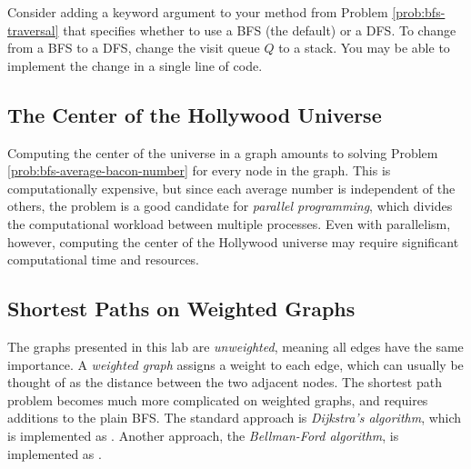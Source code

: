Consider adding a keyword argument to your method from Problem \ref{prob:bfs-traversal} that specifies whether to use a BFS (the default) or a DFS.
To change from a BFS to a DFS, change the visit queue $Q$ to a stack.
You may be able to implement the change in a single line of code.

\subsection*{The Center of the Hollywood Universe} %

Computing the center of the universe in a graph amounts to solving Problem \ref{prob:bfs-average-bacon-number} for every node in the graph.
This is computationally expensive, but since each average number is independent of the others, the problem is a good candidate for \emph{parallel programming}, which divides the computational workload between multiple processes.
Even with parallelism, however, computing the center of the Hollywood universe may require significant computational time and resources.

\subsection*{Shortest Paths on Weighted Graphs} %

The graphs presented in this lab are \emph{unweighted}, meaning all edges have the same importance.
A \emph{weighted graph} assigns a weight to each edge, which can usually be thought of as the distance between the two adjacent nodes.
The shortest path problem becomes much more complicated on weighted graphs, and requires additions to the plain BFS.
The standard approach is \emph{Dijkstra's algorithm}, which is implemented as .
Another approach, the \emph{Bellman-Ford algorithm}, is implemented as .
